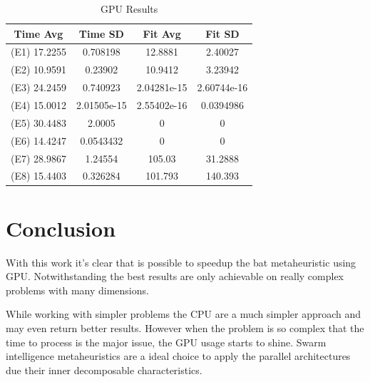 \documentclass[conference]{IEEEtran}
\begin{document}
\begin{table}[H]
    \renewcommand{\arraystretch}{1.3}
    \caption{GPU Results}
    \label{results-gpu}
    \centering
    \begin{tabular}{c|c|c|c}
    \hline
        Time Avg & Time SD & Fit Avg & Fit SD\\
    \hline
        (E1) 17.2255  & 0.708198 &  12.8881 & 2.40027 \\
        (E2) 10.9591  & 0.23902 & 10.9412 & 3.23942 \\
        (E3) 24.2459  & 0.740923  & 2.04281e-15 & 2.60744e-16 \\
        (E4) 15.0012 & 2.01505e-15 & 2.55402e-16 & 0.0394986 \\
        (E5) 30.4483  & 2.0005    & 0 & 0 \\
        (E6) 14.4247 & 0.0543432 & 0 & 0 \\
        (E7) 28.9867 & 1.24554 & 105.03 & 31.2888 \\
        (E8) 15.4403 & 0.326284 & 101.793 & 140.393 \\
    \end{tabular}
\end{table}




\section{Conclusion} %

With this work it's clear that is possible to speedup the bat
metaheuristic using GPU. Notwithstanding the best results are only
achievable on really complex problems with many dimensions.

While working with simpler problems the CPU are a much simpler approach
and may even return better results. However when the problem is so
complex that the time to process is the major issue, the GPU usage
starts to shine. Swarm intelligence metaheuristics are a ideal choice to
apply the parallel architectures due their inner decomposable characteristics.
\end{document}
